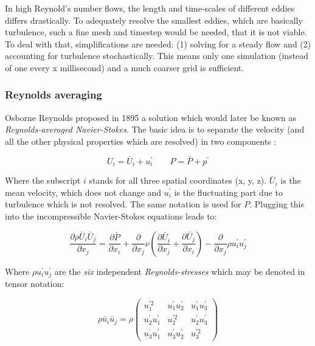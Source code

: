 In high Reynold's number flows, the length and time-scales of different eddies
differs drastically. To adequately resolve the smallest eddies, which are
basically turbulence, such a fine mesh and timestep would be needed, that it is
not viable. To deal with that, simplifications are needed: (1) solving for a
steady flow and (2) accounting for turbulence stochastically. This means only
one simulation (instead of one every x millisecond) and a much coarser grid is
sufficient.

\subsubsection{Reynolds averaging}
Osborne Reynolds proposed in 1895 a solution which would later be known as
\textit{Reynolds-averaged Navier-Stokes}. The basic idea is to separate the
velocity (and all the other physical properties which are resolved) in two
components \cite{leschziner2015statistical}:

\begin{equation}
  U_{i} = \bar U_{i} + u_{i}^{\prime} \qquad
  P = \bar P + p^{\prime}
\end{equation}

\noindent Where the subscript $i$ stands for all three spatial coordinates (x,
y, z). $\bar U_{i}$ is the mean velocity, which does not change and
$u_{i}^{\prime}$ is the fluctuating part due to turbulence which is not
resolved. The same notation is used for $P$. Plugging this into the
incompressible Navier-Stokes equations leads to:

\begin{equation}
  \label{eq:incomp_RANS}
  \frac{\partial \rho \bar U_{i} \bar U_{j}}{\partial x_{j}} =
  \frac{\partial \bar P}{\partial x_{i}} +
  \frac{\partial}{\partial x_{j}} \nu (\frac{\partial \bar U_{i}}{\partial x_{j}} +
  \frac{\partial \bar U_{j}}{\partial x_{i}}) -
  \frac{\partial}{\partial x_{j}} \rho u_{i}^{\prime} u_{j}^{\prime}
\end{equation}

\noindent Where $\rho u_{i}^{\prime} u_{j}^{\prime}$ are the \textit{six} independent
\textit{Reynolds-stresses} which may be denoted in tensor notation:

\begin{equation}
  \rho \bar u_{i} \bar u_{j} = \rho
  \begin{pmatrix}
    u_{1}^{\prime 2}              & u_{1}^{\prime} u_{2}^{\prime} & u_{1}^{\prime} u_{3}^{\prime} \\
    u_{2}^{\prime} u_{1}^{\prime} & u_{2}^{\prime 2}              & u_{2}^{\prime} u_{3}^{\prime} \\
    u_{3}^{\prime} u_{1}^{\prime} & u_{3}^{\prime} u_{2}^{\prime} & u_{3}^{\prime 2}
  \end{pmatrix}
\end{equation}

